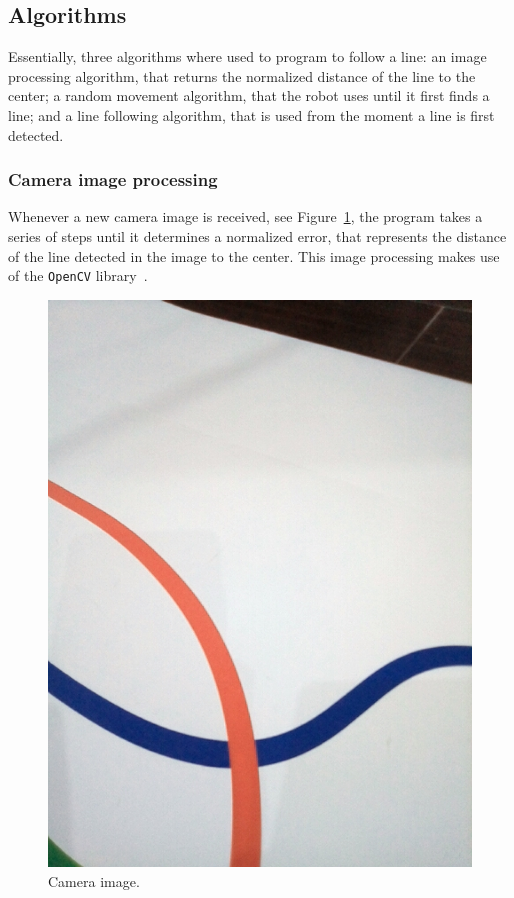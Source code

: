 \documentclass[10pt,conference,compsoc]{IEEEtran}
\begin{document}
\subsection{Algorithms}

Essentially, three algorithms where used to program \robobo to follow a line: an image processing algorithm, that returns the normalized distance of the line to the center; a random movement algorithm, that the robot uses until it first finds a line; and a line following algorithm, that is used from the moment a line is first detected.

\subsubsection{Camera image processing}

Whenever a new camera image is received, see Figure~\ref{fig:image}, the program takes a series of steps until it determines a normalized error, that represents the distance of the line detected in the image to the center. This image processing makes use of the \texttt{OpenCV} library~\cite{OpenCV}.

\begin{figure}[thpb]
\centering
\includegraphics[scale=0.4]{img/image.png}
\caption{Camera image.}
\label{fig:image}
\end{figure}
\end{document}
